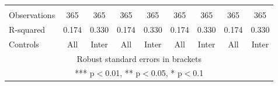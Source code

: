 \begin{tabular}{lcccccccc}
 &  &  &  &  &  &  &  &  \\
Observations & 365 & 365 & 365 & 365 & 365 & 365 & 365 & 365 \\
R-squared & 0.174 & 0.330 & 0.174 & 0.330 & 0.174 & 0.330 & 0.174 & 0.330 \\
 Controls & All & Inter & All & Inter & All & Inter & All & Inter \\ \hline
\multicolumn{9}{c}{ Robust standard errors in brackets} \\
\multicolumn{9}{c}{ *** p$<$0.01, ** p$<$0.05, * p$<$0.1} \\
\end{tabular}
